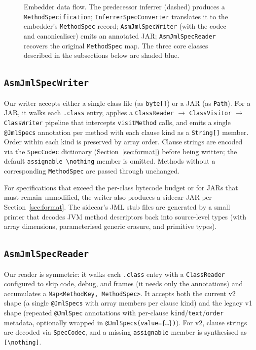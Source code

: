 \begin{figure}[!t]
\caption{Embedder data flow. The predecessor inferrer (dashed) produces a \texttt{MethodSpecification}; \texttt{InferrerSpec\-Converter} translates it to the embedder's \texttt{MethodSpec} record; \texttt{AsmJmlSpecWriter} (with the codec and canonicaliser) emits an annotated JAR; \texttt{AsmJmlSpecReader} recovers the original \texttt{MethodSpec} map. The three core classes described in the subsections below are shaded blue.}
\label{fig:pipeline}
\end{figure}

\subsection{\texttt{AsmJmlSpecWriter}}

Our writer accepts either a single class file (as \texttt{byte[]}) or a JAR (as \texttt{Path}). For a JAR, it walks each \texttt{.class} entry, applies a \texttt{ClassReader} \(\to\) \texttt{ClassVisitor} \(\to\) \texttt{ClassWriter} pipeline that intercepts \texttt{visitMethod} calls, and emits a single \texttt{@JmlSpecs} annotation per method with each clause kind as a \texttt{String[]} member. Order within each kind is preserved by array order. Clause strings are encoded via the \texttt{SpecCodec} dictionary (Section~\ref{sec:format}) before being written; the default \texttt{assignable \textbackslash nothing} member is omitted. Methods without a corresponding \texttt{MethodSpec} are passed through unchanged.

For specifications that exceed the per-class bytecode budget or for JARs that must remain unmodified, the writer also produces a sidecar JAR per Section~\ref{sec:format}. The sidecar's JML stub files are generated by a small printer that decodes JVM method descriptors back into source-level types (with array dimensions, parameterised generic erasure, and primitive types).

\subsection{\texttt{AsmJmlSpecReader}}

Our reader is symmetric: it walks each \texttt{.class} entry with a \texttt{ClassReader} configured to skip code, debug, and frames (it needs only the annotations) and accumulates a \texttt{Map<MethodKey, MethodSpec>}. It accepts both the current v2 shape (a single \texttt{@JmlSpecs} with array members per clause kind) and the legacy v1 shape (repeated \texttt{@JmlSpec} annotations with per-clause \texttt{kind}/\texttt{text}/\texttt{order} metadata, optionally wrapped in \texttt{@JmlSpecs(value=\{\dots\})}). For v2, clause strings are decoded via \texttt{SpecCodec}, and a missing \texttt{assignable} member is synthesised as \texttt{[\textbackslash nothing]}.

